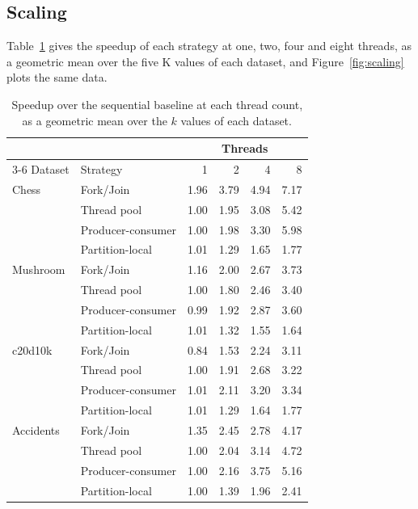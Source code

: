 \documentclass[pdflatex,sn-vancouver-num]{sn-jnl}
\theoremstyle{thmstyleone}%
\theoremstyle{thmstyletwo}%
\theoremstyle{thmstylethree}%
\newcommand{\Kk}{\mathrm{K}}
\begin{document}
\subsection{Scaling}\label{subsec:scaling}
 
Table~\ref{tab:scaling} gives the speedup of each strategy at one, two,
four and eight threads, as a geometric mean over the five $\Kk$ values of
each dataset, and Figure~\ref{fig:scaling} plots the same data.

 
\begin{table}[p]
\centering
\caption{Speedup over the sequential baseline at each thread count, as a geometric mean over the $k$ values of each dataset.}
\label{tab:scaling}
\begin{tabular}{llrrrr}
\toprule
& & \multicolumn{4}{c}{Threads} \\
\cmidrule(lr){3-6}
Dataset & Strategy & 1 & 2 & 4 & 8 \\
\midrule
Chess & Fork/Join & 1.96 & 3.79 & 4.94 & 7.17 \\
 & Thread pool & 1.00 & 1.95 & 3.08 & 5.42 \\
 & Producer-consumer & 1.00 & 1.98 & 3.30 & 5.98 \\
 & Partition-local & 1.01 & 1.29 & 1.65 & 1.77 \\
\addlinespace
Mushroom & Fork/Join & 1.16 & 2.00 & 2.67 & 3.73 \\
 & Thread pool & 1.00 & 1.80 & 2.46 & 3.40 \\
 & Producer-consumer & 0.99 & 1.92 & 2.87 & 3.60 \\
 & Partition-local & 1.01 & 1.32 & 1.55 & 1.64 \\
\addlinespace
c20d10k & Fork/Join & 0.84 & 1.53 & 2.24 & 3.11 \\
 & Thread pool & 1.00 & 1.91 & 2.68 & 3.22 \\
 & Producer-consumer & 1.01 & 2.11 & 3.20 & 3.34 \\
 & Partition-local & 1.01 & 1.29 & 1.64 & 1.77 \\
\addlinespace
Accidents & Fork/Join & 1.35 & 2.45 & 2.78 & 4.17 \\
 & Thread pool & 1.00 & 2.04 & 3.14 & 4.72 \\
 & Producer-consumer & 1.00 & 2.16 & 3.75 & 5.16 \\
 & Partition-local & 1.00 & 1.39 & 1.96 & 2.41 \\

\end{tabular}
\end{table}
\end{document}
